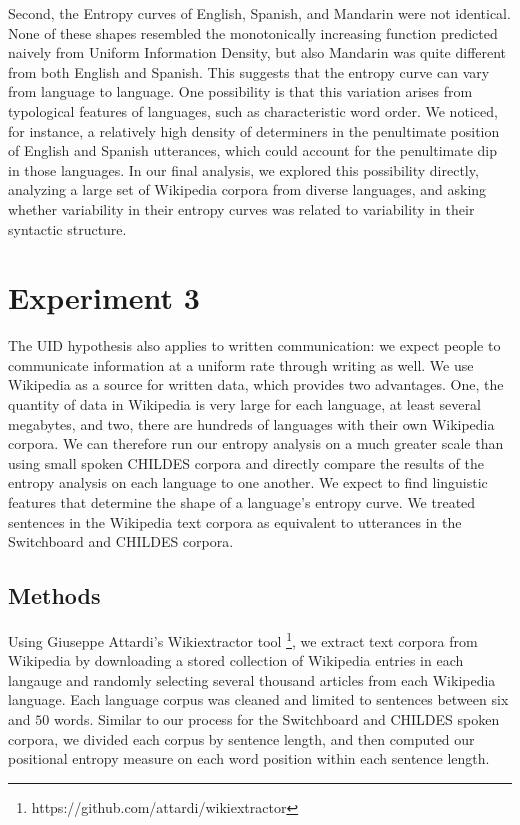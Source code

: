 \documentclass[10pt, letterpaper]{article}
\begin{document}
Second, the Entropy curves of English, Spanish, and Mandarin were not
identical. None of these shapes resembled the monotonically increasing
function predicted naively from Uniform Information Density, but also
Mandarin was quite different from both English and Spanish. This
suggests that the entropy curve can vary from language to language. One
possibility is that this variation arises from typological features of
languages, such as characteristic word order. We noticed, for instance,
a relatively high density of determiners in the penultimate position of
English and Spanish utterances, which could account for the penultimate
dip in those languages. In our final analysis, we explored this
possibility directly, analyzing a large set of Wikipedia corpora from
diverse languages, and asking whether variability in their entropy
curves was related to variability in their syntactic structure.

\hypertarget{experiment-3}{%
\section{Experiment 3}\label{experiment-3}}

The UID hypothesis also applies to written communication: we expect
people to communicate information at a uniform rate through writing as
well. We use Wikipedia as a source for written data, which provides two
advantages. One, the quantity of data in Wikipedia is very large for
each language, at least several megabytes, and two, there are hundreds
of languages with their own Wikipedia corpora. We can therefore run our
entropy analysis on a much greater scale than using small spoken CHILDES
corpora and directly compare the results of the entropy analysis on each
language to one another. We expect to find linguistic features that
determine the shape of a language's entropy curve. We treated sentences
in the Wikipedia text corpora as equivalent to utterances in the
Switchboard and CHILDES corpora.

\hypertarget{methods}{%
\subsection{Methods}\label{methods}}

Using Giuseppe Attardi's Wikiextractor tool
\footnote{https://github.com/attardi/wikiextractor}, we extract text
corpora from Wikipedia by downloading a stored collection of Wikipedia
entries in each langauge and randomly selecting several thousand
articles from each Wikipedia language. Each language corpus was cleaned
and limited to sentences between six and \(50\) words. Similar to our
process for the Switchboard and CHILDES spoken corpora, we divided each
corpus by sentence length, and then computed our positional entropy
measure on each word position within each sentence length.
\end{document}
